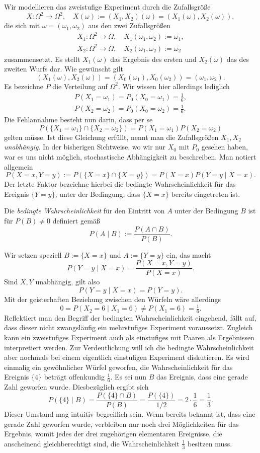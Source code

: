 Wir modellieren das zweistufige Experiment durch die Zufallsgröße
\[X\colon\Omega^2\to\Omega^2,\quad X(\omega) := (X_1,X_2)(\omega)
= (X_1(\omega), X_2(\omega)),\]
die sich mit $\omega = (\omega_1,\omega_2)$ aus den zwei Zufallsgrößen
\begin{gather*}
X_1\colon\Omega^2\to\Omega,\quad X_1(\omega_1,\omega_2) := \omega_1,\\
X_2\colon\Omega^2\to\Omega,\quad X_2(\omega_1,\omega_2) := \omega_2
\end{gather*}
zusammensetzt. Es stellt $X_1(\omega)$ das Ergebnis des ersten und
$X_2(\omega)$ das des zweiten Wurfs dar. Wie gewünscht gilt
\[(X_1(\omega),X_2(\omega)) = (X_0(\omega_1),X_0(\omega_2)) = (\omega_1,\omega_2).\]
Es bezeichne $P$ die Verteilung auf $\Omega^2$. Wir wissen hier allerdings
lediglich
\begin{gather*}
P(X_1=\omega_1) = P_0(X_0=\omega_1) = \tfrac{1}{6},\\
P(X_2=\omega_2) = P_0(X_0=\omega_2) = \tfrac{1}{6}.
\end{gather*}
Die Fehlannahme besteht nun darin, dass per se
\[P(\{X_1=\omega_1\}\cap\{X_2=\omega_2\}) = P(X_1=\omega_1)P(X_2=\omega_2)\]
gelten müsse. Ist diese Gleichung erfüllt, nennt man die
Zufallsgrößen $X_1,X_2$ \emph{unabhängig}. In der bisherigen Sichtweise,
wo wir nur $X_0$ mit $P_0$ gesehen haben, war es uns nicht möglich,
stochastische Abhängigkeit zu beschreiben. Man notiert allgemein%
\[P(X=x,Y=y) := P(\{X=x\}\cap\{X=y\}) = P(X=x)P(Y=y\mid X=x).\]
Der letzte Faktor bezeichne hierbei die bedingte Wahrscheinlichkeit
für das Ereignis $\{Y=y\}$, unter der Bedingung, dass $\{X=x\}$
bereits eingetreten ist.
\begin{Definition}\newlinefirst
Die \emph{bedingte Wahrscheinlichkeit} für den Eintritt von $A$ unter
der Bedingung $B$ ist für $P(B)\ne 0$ definiert gemäß
\[P(A\mid B) := \frac{P(A\cap B)}{P(B)}.\]
\end{Definition}
Wir setzen speziell $B:=\{X=x\}$ und $A:=\{Y=y\}$ ein,
das macht
\[P(Y=y\mid X=x) = \frac{P(X=x,Y=y)}{P(X=x)}.\]
Sind $X,Y$ unabhängig, gilt also
\[P(Y=y\mid X=x) = P(Y=y).\]
Mit der geisterhaften Beziehung zwischen den Würfeln wäre allerdings
\[0 = P(X_2=6\mid X_1=6) \ne P(X_1=6) = \tfrac{1}{6}.\]
Reflektiert man den Begriff der bedingten Wahrscheinlichkeit
eingehend, fällt auf, dass dieser nicht zwangsläufig ein mehrstufiges
Experiment voraussetzt. Zugleich kann ein zweistufiges Experiment auch
als einstufiges mit Paaren als Ergebnissen interpretiert werden. Zur
Verdeutlichung will ich die bedingte Wahrscheinlichkeit aber nochmals
bei einem eigentlich einstufigen Experiment diskutieren. Es wird
einmalig ein gewöhnlicher Würfel geworfen, die Wahrscheinlichkeit für das
Ereignis $\{4\}$ beträgt offenkundig $\frac{1}{6}$. Es sei nun $B$ das
Ereignis, dass eine gerade Zahl geworfen wurde. Diesbezüglich ergibt sich
\[P(\{4\}\mid B) = \frac{P(\{4\}\cap B)}{P(B)} = \frac{P(\{4\})}{1/2}
= 2\cdot\frac{1}{6} = \frac{1}{3}.\]
Dieser Umstand mag intuitiv begreiflich sein. Wenn bereits bekannt
ist, dass eine gerade Zahl geworfen wurde, verbleiben nur noch drei
Möglichkeiten für das Ergebnis, womit jedes der drei zugehörigen
elementaren Ereignisse, die anscheinend gleichberechtigt sind, die
Wahrscheinlichkeit $\frac{1}{3}$ besitzen muss.

